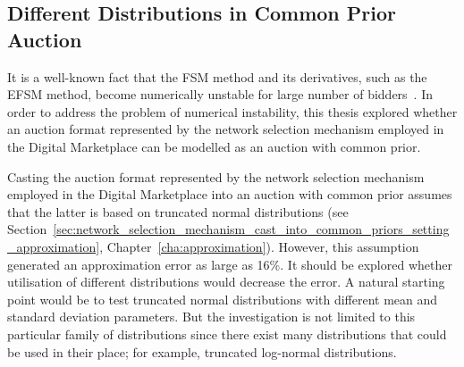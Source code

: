 \subsection{Different Distributions in Common Prior Auction}
\label{sub:different_distributions_in_common_prior_auction_conclusions}
It is a well-known fact that the FSM method and its derivatives, such as the EFSM method, become numerically unstable for large number of bidders~\cite{FibichGavish2011}. In order to address the problem of numerical instability, this thesis explored whether an auction format represented by the network selection mechanism employed in the Digital Marketplace can be modelled as an auction with common prior.

Casting the auction format represented by the network selection mechanism employed in the Digital Marketplace into an auction with common prior assumes that the latter is based on truncated normal distributions (see Section~\ref{sec:network_selection_mechanism_cast_into_common_priors_setting_approximation}, Chapter~\ref{cha:approximation}). However, this assumption generated an approximation error as large as 16\%. It should be explored whether utilisation of different distributions would decrease the error. A natural starting point would be to test truncated normal distributions with different mean and standard deviation parameters. But the investigation is not limited to this particular family of distributions since there exist many distributions that could be used in their place; for example, truncated log-normal distributions.
